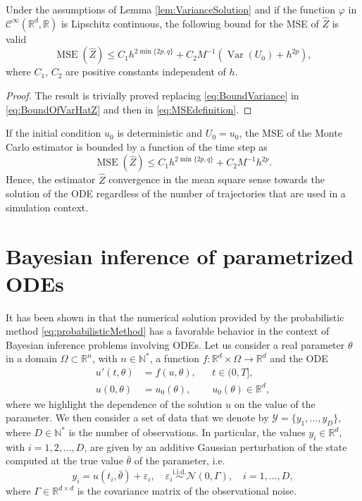 \documentclass{siamart1116}
\numberwithin{theorem}{section}
\renewcommand{\phi}{\varphi}
\newcommand{\iid}{\ensuremath{\stackrel{\text{i.i.d.}}{\sim}}}
\newcommand{\N}{\mathbb{N}}
\newcommand{\R}{\mathbb{R}}
\newcommand{\epl}{\varepsilon}
\newcommand{\Var}{\operatorname{Var}}
\newcommand{\MSE}{\operatorname{MSE}}
\begin{document}
\begin{theorem}\label{thm:MSE} Under the assumptions of Lemma \ref{lem:VarianceSolution} and if the function $\phi$ in $\mathcal C^\infty(\R^d, \R)$ is Lipschitz continuous, the following bound for the MSE of $\hat Z$ is valid
	\begin{equation}
		\MSE(\hat Z) \leq C_1 h^{2\min\{2p, q\}} + C_2 M^{-1} (\Var(U_0) + h^{2p}),
	\end{equation}	
	where $C_1$, $C_2$ are positive constants independent of $h$.	
\end{theorem}

\begin{proof}
	The result is trivially proved replacing \eqref{eq:BoundVariance} in \eqref{eq:BoundOfVarHatZ} and then in \eqref{eq:MSEdefinition}.
\end{proof}

\begin{remark} If the initial condition $u_0$ is deterministic and $U_0 = u_0$, the MSE of the Monte Carlo estimator is bounded by a function of the time step as
	\begin{equation}
		\MSE(\hat Z) \leq C_1 h^{2\min\{2p, q\}} + C_2 M^{-1} h^{2p}.
	\end{equation}
	Hence, the estimator $\hat Z$ convergence in the mean square sense towards the solution of the ODE regardless of the number of trajectories that are used in a simulation context.
\end{remark}

\section{Bayesian inference of parametrized ODEs}\label{sect:Bayes}

It has been shown in \cite{CGS16} that the numerical solution provided by the probabilistic method \eqref{eq:probabilisticMethod} has a favorable behavior in the context of Bayesian inference problems involving ODEs. Let us consider a real parameter $\theta$ in a domain $\Omega \subset \R^n$, with $n \in \N^*$, a function $f \colon \R^d\times \Omega \to\R^d$ and the ODE
\begin{equation}\label{eq:ParamODE}
\begin{aligned}
	u'(t, \theta) &= f(u, \theta), &&  t \in (0, T], \\
	u(0, \theta)  &= u_0(\theta), && u_0(\theta) \in \R^d,
\end{aligned}
\end{equation}
where we highlight the dependence of the solution $u$ on the value of the parameter. We then consider a set of data that we denote by $\mathcal{Y} = \{y_1, \ldots, y_D\}$, where $D \in \N^*$ is the number of observations. In particular, the values $y_i \in \R^d$, with $i = 1, 2, \ldots, D$, are given by an additive Gaussian perturbation of the state computed at the true value $\bar \theta$ of the parameter, i.e.
\begin{equation}
	y_i = u(t_i, \bar \theta) + \epl_i, \quad \epl_i \iid \mathcal{N}(0, \Gamma), \quad i = 1, \ldots, D,
\end{equation}
where $\Gamma \in \R^{d\times d}$ is the covariance matrix of the observational noise.
\end{document}
